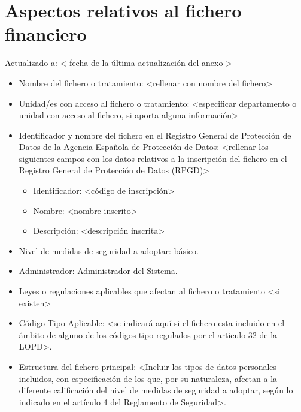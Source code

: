 \documentclass[a4paper,11pt,bibtotoc,noliststotoc]{scrbook}
\begin{document}
\section{Aspectos relativos al fichero financiero}


Actualizado a: < fecha de la última actualización del anexo >

\begin{itemize}
\item Nombre del fichero o tratamiento: <rellenar con nombre del fichero>

\item Unidad/es con acceso al fichero o tratamiento: <especificar departamento o unidad con acceso al fichero, si aporta alguna información>

\item Identificador y nombre del fichero en el Registro General de Protección de Datos de la Agencia Española de Protección de Datos: <rellenar los siguientes campos con los datos relativos a la inscripción del fichero en el Registro General de Protección de Datos (RPGD)>
	\begin{itemize}
	\item Identificador: <código de inscripción>
	\item Nombre: <nombre inscrito>
	\item Descripción: <descripción inscrita>
	\end{itemize}

\item Nivel de medidas de seguridad a adoptar: básico.

\item Administrador: Administrador del Sistema.

\item Leyes o regulaciones aplicables que afectan al fichero o tratamiento <si existen>

\item Código Tipo Aplicable: <se indicará aquí si el fichero esta incluido en el ámbito de alguno de los códigos tipo regulados por el articulo 32 de la LOPD>.

\item Estructura del fichero principal: <Incluir los tipos de datos personales incluidos, con especificación de los que, por su naturaleza, afectan a la diferente calificación del nivel de medidas de seguridad a adoptar, según lo indicado en el artículo 4 del Reglamento de Seguridad>.


\end{itemize}
\end{document}

